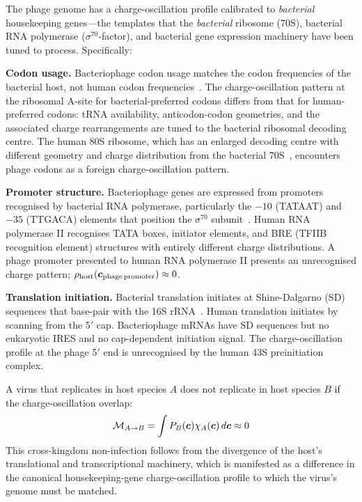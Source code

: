 The phage genome has a charge-oscillation profile calibrated to \emph{bacterial} housekeeping genes---the templates that the \emph{bacterial} ribosome (70S), bacterial RNA polymerase ($\sigma^{70}$-factor), and bacterial gene expression machinery have been tuned to process. Specifically:

\textbf{Codon usage.} Bacteriophage codon usage matches the codon frequencies of the bacterial host, not human codon frequencies~\cite{Karlin2001,Nakamura2000}. The charge-oscillation pattern at the ribosomal A-site for bacterial-preferred codons differs from that for human-preferred codons: tRNA availability, anticodon-codon geometries, and the associated charge rearrangements are tuned to the bacterial ribosomal decoding centre. The human 80S ribosome, which has an enlarged decoding centre with different geometry and charge distribution from the bacterial 70S~\cite{Melnikov2012}, encounters phage codons as a foreign charge-oscillation pattern.

\textbf{Promoter structure.} Bacteriophage genes are expressed from promoters recognised by bacterial RNA polymerase, particularly the $-10$ (TATAAT) and $-35$ (TTGACA) elements that position the $\sigma^{70}$ subunit~\cite{Haugen2008}. Human RNA polymerase II recognises TATA boxes, initiator elements, and BRE (TFIIB recognition element) structures with entirely different charge distributions. A phage promoter presented to human RNA polymerase II presents an unrecognised charge pattern; $\rho_{\mathrm{host}}(\boldsymbol{c}_{\mathrm{phage\,promoter}}) \approx 0$.

\textbf{Translation initiation.} Bacterial translation initiates at Shine-Dalgarno (SD) sequences that base-pair with the 16S rRNA~\cite{Shine1975}. Human translation initiates by scanning from the 5$'$ cap. Bacteriophage mRNAs have SD sequences but no eukaryotic IRES and no cap-dependent initiation signal. The charge-oscillation profile at the phage 5$'$ end is unrecognised by the human 43S preinitiation complex.

\begin{proposition}
\label{v:prop:cross_kingdom}
A virus that replicates in host species $A$ does not replicate in host species $B$ if the charge-oscillation overlap:
\begin{equation}
  \mathcal{M}_{A \to B} = \int P_B(\boldsymbol{c}) \chi_A(\boldsymbol{c})\,d\boldsymbol{c} \approx 0
\end{equation}
This cross-kingdom non-infection follows from the divergence of the host's translational and transcriptional machinery, which is manifested as a difference in the canonical housekeeping-gene charge-oscillation profile to which the virus's genome must be matched.
\end{proposition}

